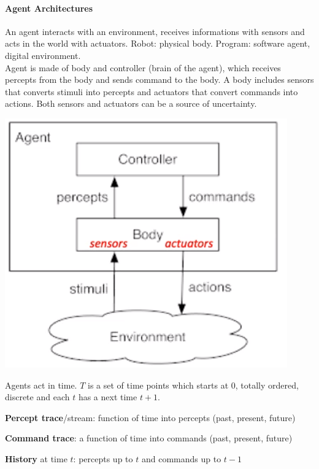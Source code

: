 \documentclass[10pt]{report}
\begin{document}
\paragraph{Agent Architectures} An agent interacts with an environment, receives informations with sensors and acts in the world with actuators. Robot: physical body. Program: software agent, digital environment.\\
Agent is made of body and controller (brain of the agent), which receives percepts from the body and sends command to the body. A body includes sensors that converts stimuli into percepts and actuators that convert commands into actions. Both sensors and actuators can be a source of uncertainty.
\begin{center}
	\includegraphics[scale=0.5]{3.png}
\end{center}
Agents act in time. $T$ is a set of time points which starts at 0, totally ordered, discrete and each $t$ has a next time $t+1$.\begin{list}{}{}
	\item \textbf{Percept trace}/stream: function of time into percepts (past, present, future)
	\item \textbf{Command trace}: a function of time into commands (past, present, future)
	\item \textbf{History} at time $t$: percepts up to $t$ and commands up to $t-1$
\end{list}
\end{document}
